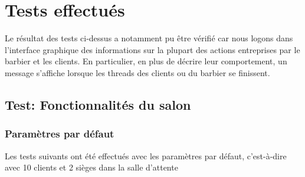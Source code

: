\documentclass{article}
\begin{document}
\section*{Tests effectués}

Le résultat des tests ci-dessus a notamment pu être vérifié car nous logons dans l'interface graphique des informations sur la plupart des 
actions entreprises par le barbier et les clients. En particulier, en plus de décrire leur comportement, un message s'affiche lorsque
les threads des clients ou du barbier se finissent.

\subsection*{Test: Fonctionnalités du salon}

\subsubsection*{Paramètres par défaut}

Les tests suivants ont été effectués avec les paramètres par défaut, c'est-à-dire avec 10 clients et 2 sièges dans la salle d'attente
\end{document}
